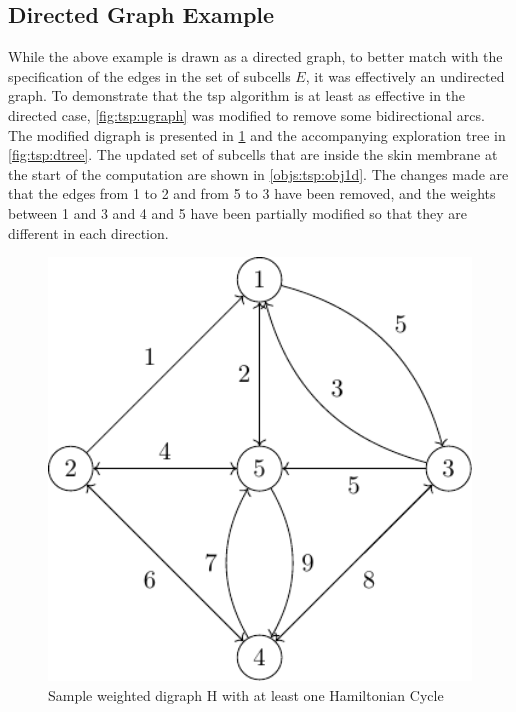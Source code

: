 
\subsection{Directed Graph Example}
While the above example is drawn as a directed graph, to better match with the specification of the edges in the set of subcells \(E\), it was effectively an undirected graph.  To demonstrate that the \gls{tsp} algorithm is at least as effective in the directed case, \cref{fig:tsp:ugraph} was modified to remove some bidirectional arcs.  The modified digraph is presented in \cref{fig:tsp:digraph} and the accompanying exploration tree in \cref{fig:tsp:dtree}.  The updated set of subcells that are inside the skin membrane at the start of the computation are shown in \cref{objs:tsp:obj1d}.  The changes made are that the edges from 1 to 2 and from 5 to 3 have been removed, and the weights between 1 and 3 and 4 and 5 have been partially modified so that they are different in each direction.

\begin{figure}
\centering
\includegraphics[keepaspectratio,width=1.0\textwidth,height=0.35\textheight]{chapters/tsp/figs/ugraph-figure2}
\caption{\label{fig:tsp:digraph}Sample weighted digraph H with at least one Hamiltonian Cycle}
\end{figure}

